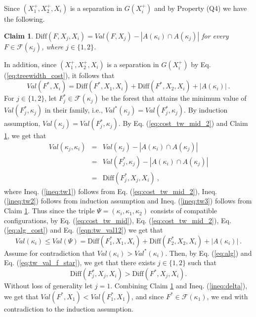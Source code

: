 \documentclass[12pt]{article}
\newtheorem{claim}{Claim}[section]
\newcommand{\DIFF}[0]{\mbox{Diff}}
\begin{document}
Since $(X_1^{+}, X_2^{+}, X_i)$ is a separation in $G(X_i^{+})$ and by Property (Q4) we have the following.

\begin{claim}
\label{cl:tw1}
$\DIFF(F,X_j,X_i)=Val(F, X_j)-|A(\kappa_i) \cap A(\kappa_j)|$ for every $F \in \mathcal{F}(\kappa_j)$, where $j \in \{1,2\}$.
\end{claim}

In addition, since $(X_1^{+}, X_2^{+}, X_i)$ is a separation in $G(X_i^{+})$ by Eq. (\ref{eq:treewidth_cost}), it follows that
\begin{equation}
\label{eq:tw_val_f_star}
Val(F^{*}, X_i)=\DIFF(F^{*},X_1,X_i)+\DIFF(F^{*},X_2,X_i)+|A(\kappa_i)|~.
\end{equation}
For $j \in \{1,2\}$, let $F_j^{*} \in \mathcal{F}(\kappa_j)$ be the forest that attains the minimum value of $Val(F_j^{*}, \kappa_j)$ in their family, i.e.,
$Val^{*}(\kappa_j)=Val(F_j^{*}, \kappa_j)$.
By induction assumption, $Val(\kappa_j)=Val(F_j^{*}, \kappa_j)$.
By Eq. (\ref{eq:cost_tw_mid_2}) and Claim \ref{cl:tw1}, we get that
\begin{eqnarray}
\label{eqn:tw_val12}
Val(\kappa_{j}, \kappa_{i})&=&Val(\kappa_{j})-|A(\kappa_{i}) \cap A(\kappa_{j})| \label{ineq:tw1}
\\&=&
Val(F_j^{*}, \kappa_j)-|A(\kappa_{i}) \cap A(\kappa_{j})| \label{ineq:tw2}
\\&=&
\DIFF(F_j^{*},X_j,X_i)~, \label{ineq:tw3}
\end{eqnarray}
where Ineq. (\ref{ineq:tw1}) follows from Eq. (\ref{eq:cost_tw_mid_2}),
Ineq. (\ref{ineq:tw2}) follows from induction assumption and
Ineq. (\ref{ineq:tw3}) follows from Claim \ref{cl:tw1}.
Thus since the triple $\Psi=(\kappa_i, \kappa_1, \kappa_2)$ consists of compatible configurations, by Eq.  (\ref{eq:cost_tw_mid}), Eq. (\ref{eq:cost_tw_mid_2}), Eq. (\ref{eq:alg_cost}) and Eq. (\ref{eqn:tw_val12})
we get that
\begin{equation}
\label{eq:alg}
Val(\kappa_i)\leq Val(\Psi)=\DIFF(F_1^{*},X_1,X_i)+\DIFF(F_2^{*},X_2,X_i)+|A(\kappa_i)|~.
\end{equation}
Assume for contradiction that $Val(\kappa_i) > Val^{*}(\kappa_i)$. Then, by
Eq. (\ref{eq:alg}) and Eq. (\ref{eq:tw_val_f_star}), we get that
there exists $j \in \{1,2\}$ such that
\begin{equation}
\label{ineq:delta}
\DIFF(F_j^{*},X_j,X_i)>\DIFF(F^{*},X_j,X_i).
\end{equation}
Without loss of generality let $j=1$.
Combining Claim \ref{cl:tw1} and Ineq. (\ref{ineq:delta}), we get that $Val(F^{*}, X_1)<Val(F^{*}_1, X_1)$, and since $F^{*} \in \mathcal{F}(\kappa_1)$, we end with contradiction to the induction assumption.
\end{document}
